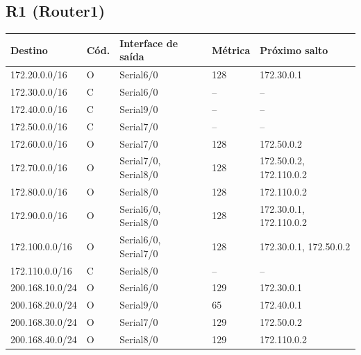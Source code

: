 \subsection*{R1 (Router1)}
\begin{tabular}{@{}llllp{3.6cm}@{}}\toprule Destino & Cód. & Interface de saída & Métrica & Próximo salto\\\midrule
172.20.0.0/16 & O & Serial6/0 & 128 & 172.30.0.1\\
172.30.0.0/16 & C & Serial6/0 & -- & --\\
172.40.0.0/16 & C & Serial9/0 & -- & --\\
172.50.0.0/16 & C & Serial7/0 & -- & --\\
172.60.0.0/16 & O & Serial7/0 & 128 & 172.50.0.2\\
172.70.0.0/16 & O & Serial7/0, Serial8/0 & 128 & 172.50.0.2, 172.110.0.2\\
172.80.0.0/16 & O & Serial8/0 & 128 & 172.110.0.2\\
172.90.0.0/16 & O & Serial6/0, Serial8/0 & 128 & 172.30.0.1, 172.110.0.2\\
172.100.0.0/16 & O & Serial6/0, Serial7/0 & 128 & 172.30.0.1, 172.50.0.2\\
172.110.0.0/16 & C & Serial8/0 & -- & --\\
200.168.10.0/24 & O & Serial6/0 & 129 & 172.30.0.1\\
200.168.20.0/24 & O & Serial9/0 & 65 & 172.40.0.1\\
200.168.30.0/24 & O & Serial7/0 & 129 & 172.50.0.2\\
200.168.40.0/24 & O & Serial8/0 & 129 & 172.110.0.2\\
\bottomrule\end{tabular}

